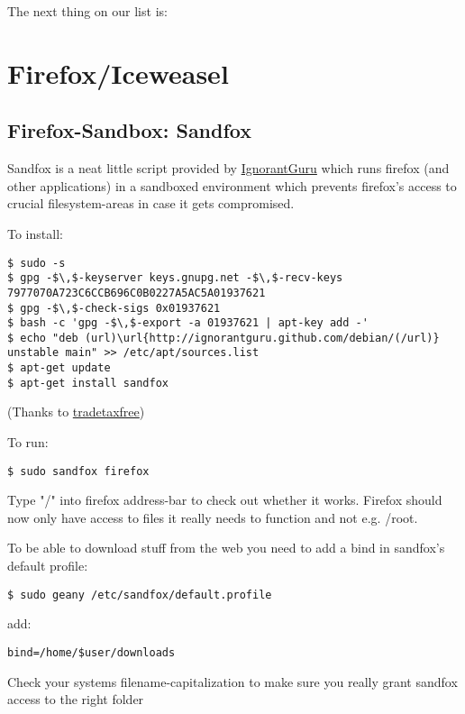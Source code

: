 \documentclass{article}
\begin{document}
 The next thing on our list is: 
\section{Firefox/Iceweasel}
\subsection{Firefox-Sandbox: Sandfox}


 Sandfox is a neat little script provided by \href{https://igurublog.wordpress.com/downloads/script-sandfox/}{IgnorantGuru} which runs firefox (and other applications) in a sandboxed environment which prevents firefox's access to crucial filesystem-areas in case it gets compromised. 


 To install: 
\begin{lstlisting}
$ sudo -s
$ gpg -$\,$-keyserver keys.gnupg.net -$\,$-recv-keys 7977070A723C6CCB696C0B0227A5AC5A01937621
$ gpg -$\,$-check-sigs 0x01937621
$ bash -c 'gpg -$\,$-export -a 01937621 | apt-key add -'
$ echo "deb (url)\url{http://ignorantguru.github.com/debian/(/url)} unstable main" >> /etc/apt/sources.list
$ apt-get update
$ apt-get install sandfox
\end{lstlisting}



 (Thanks to \href{http://crunchbang.org/forums/viewtopic.php?id=20868}{tradetaxfree})


 To run: 
\begin{lstlisting}
$ sudo sandfox firefox
\end{lstlisting}



 Type "/" into firefox address-bar to check out whether it works. Firefox should now only have access to files it really needs to function and not e.g. /root.


 To be able to download stuff from the web you need to add a bind in sandfox's default profile: 
\begin{lstlisting}
$ sudo geany /etc/sandfox/default.profile
\end{lstlisting}



 add: 
\begin{lstlisting}
bind=/home/$user/downloads
\end{lstlisting}



 Check your systems filename-capitalization to make sure you really grant sandfox access to the right folder
\end{document}
